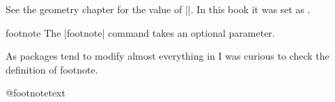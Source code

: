 
 \begin{macro}{\footnotesep}
See the geometry chapter for the value of |\footnotesep|. In this book it was set as \the\footnotesep.
    \begin{teX}
\newdimen\footnotesep
    \end{teX}
 \end{macro}



 \begin{docCommand}{footnote}{}
 The \latexe |footnote| command takes an optional parameter. 
 \end{docCommand}
 
    \begin{teX}
\def\footnote{\@ifnextchar[\@xfootnote{\stepcounter\@mpfn
     \protected@xdef\@thefnmark{\thempfn}%
     \@footnotemark\@footnotetext}}
    \end{teX}

As packages tend to modify almost everything in \latexe I was curious to check the
definition of footnote.



 \begin{macro}{\@xfootnote}
    \begin{teX}
\def\@xfootnote[#1]{%
   \begingroup 
     \csname c@\@mpfn\endcsname #1\relax
     \unrestored@protected@xdef\@thefnmark{\thempfn}%
   \endgroup
   \@footnotemark\@footnotetext}
    \end{teX}
 \end{macro}

 \begin{docCommand}{@footnotetext}{}
    \begin{teX}
\long{}%
    \end{teX}
 \end{docCommand}

